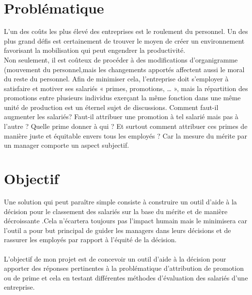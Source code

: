 \section*{Problématique}

L’un des coûts les plus élevé des entreprises est le roulement du personnel.  Un des plus grand défis est certainement de trouver le moyen de créer un environnement favorisant la mobilisation qui peut engendrer la productivité.\\
Non seulement, il est coûteux de procéder à des modifications d'organigramme (mouvement du personnel,mais les changements apportés affectent aussi le moral du reste du personnel. Afin de minimiser cela, l’entreprise doit s’employer à satisfaire et motiver ses salariés « primes, promotions, … », mais la répartition des promotions entre plusieurs individus exerçant la même fonction dans une même unité de production est un éternel sujet de discussions. Comment faut-il augmenter les salariés? Faut-il attribuer une promotion à tel salarié mais pas à l’autre ? Quelle prime donner à qui ? Et surtout comment attribuer ces primes de manière juste et équitable envers tous les employés ? Car la mesure du mérite par un manager comporte un aspect  subjectif.\\


\section*{Objectif}
Une solution qui peut paraître simple consiste à construire un outil d’aide à la décision pour le classement des salariés sur la base du mérite et de manière décroissante .Cela n’écartera toujours pas l’impact humain mais le minimisera car l’outil a pour but principal de guider les managers dans leurs décisions et de rassurer les employés par rapport à l’équité de la décision.\\
 \\
L’objectif de mon projet est de concevoir un outil d’aide à la décision pour apporter des réponses pertinentes à la problématique d’attribution de promotion ou de prime et cela en testant différentes méthodes d’évaluation des salariés d’une entreprise.  


\newpage




